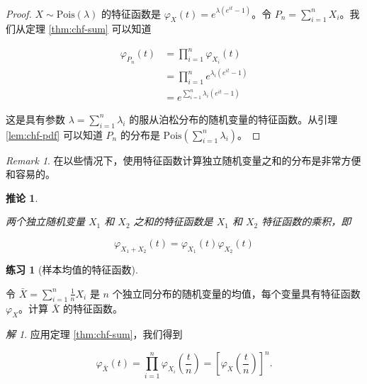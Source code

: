 \documentclass[
  12pt,
]{krantz}
\newtheorem{corollary}{推论}[chapter]
\theoremstyle{definition}
\theoremstyle{definition}
\theoremstyle{definition}
\newtheorem{exercise}{练习}[chapter]
\theoremstyle{definition}
\theoremstyle{remark}
\newtheorem*{remark}{Remark}
\newtheorem*{solution}{解}
\begin{document}
\begin{proof}

\(X\sim\mathrm{Pois}(\lambda)\) 的特征函数是 \(\varphi _{X}(t)=e^{\lambda (e^{it}-1)}\)。令 \(P_n=\sum_{i=1}^nX_i\)。我们从定理 \ref{thm:chf-sum} 可以知道

\begin{equation*}
\begin{split}
\varphi _{P_{n}}(t) & =\prod_{i=1}^n\varphi _{X_i}(t) \\
& =\prod_{i=1}^n e^{\lambda_i (e^{it}-1)} \\
& = e^{\sum_{i=1}^n \lambda_i (e^{it}-1)}
\end{split}
\end{equation*}

这是具有参数 \(\lambda=\sum_{i=1}^n \lambda_i\) 的服从泊松分布的随机变量的特征函数。从引理 \ref{lem:chf-pdf} 可以知道 \(P_n\) 的分布是 \(\mathrm{Pois}(\sum_{i=1}^n\lambda_i)\)。

\end{proof}

\begin{remark}

在以些情况下，使用特征函数计算独立随机变量之和的分布是非常方便和容易的。

\end{remark}

\begin{corollary}
\protect\hypertarget{cor:unlabeled-div-6}{}\label{cor:unlabeled-div-6}

两个独立随机变量 \(X_1\) 和 \(X_2\) 之和的特征函数是 \(X_1\) 和 \(X_2\) 特征函数的乘积，即

\[\varphi _{X_1+X_2}(t)=\varphi _{X_1}(t) \varphi _{X_2}(t)\]

\end{corollary}

\begin{exercise}[样本均值的特征函数]
\protect\hypertarget{exr:unlabeled-div-7}{}\label{exr:unlabeled-div-7}

令 \(\bar{X}=\sum_{i=1}^n \frac{1}{n} X_i\) 是 \(n\) 个独立同分布的随机变量的均值，每个变量具有特征函数 \(\varphi _{X}\)。计算 \(\bar{X}\) 的特征函数。

\end{exercise}

\begin{solution}

应用定理 \ref{thm:chf-sum}，我们得到

\[\varphi _{\bar{X}}(t)=\prod_{i=1}^n \varphi _{X_i}\left(\frac{t}{n}\right)=\left[\varphi _{X}\left(\frac{t}{n}\right)\right]^n.\]

\end{solution}
\end{document}
